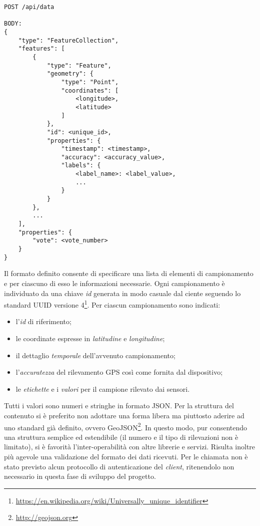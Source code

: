 \begin{verbatim}
POST /api/data

BODY: 
{
    "type": "FeatureCollection",
    "features": [
        {
            "type": "Feature",
            "geometry": {
                "type": "Point",
                "coordinates": [
                    <longitude>,
                    <latitude>
                ]
            },
            "id": <unique_id>,
            "properties": {
                "timestamp": <timestamp>,
                "accuracy": <accuracy_value>,
                "labels": {
                    <label_name>: <label_value>,
                    ...
                }
            }
        },
        ...
    ],
    "properties": {
        "vote": <vote_number>
    }
}
\end{verbatim}
 Il formato definito consente di specificare una lista di elementi di campionamento e per ciascuno di esso le informazioni necessarie. Ogni campionamento è individuato da una chiave \emph{id} generata in modo casuale dal ciente seguendo lo standard UUID versione 4\footnote{\url{https://en.wikipedia.org/wiki/Universally_unique_identifier}}. Per ciascun campionamento sono indicati:
\begin{itemize}
	\item l'\emph{id} di riferimento;
	\item le coordinate espresse in \emph{latitudine} e \emph{longitudine};
	\item il dettaglio \emph{temporale} dell'avvenuto campionamento;
	\item l'\emph{accuratezza} del rilevamento GPS così come fornita dal dispositivo;
	\item le \emph{etichette} e i \emph{valori} per il campione rilevato dai sensori.
\end{itemize}
Tutti i valori sono numeri e stringhe in formato JSON. Per la struttura del contenuto si è preferito non adottare una forma libera ma piuttosto aderire ad uno standard già definito, ovvero GeoJSON\footnote{\url{http://geojson.org}}. In questo modo, pur consentendo una struttura semplice ed estendibile (il numero e il tipo di rilevazioni non è limitato), si è favorità l'inter-operabilità con altre librerie e servizi. Risulta inoltre più agevole una validazione del formato dei dati ricevuti.
Per le chiamata non è stato previsto alcun protocollo di autenticazione del \emph{client}, ritenendolo non necessario in questa fase di sviluppo del progetto.

